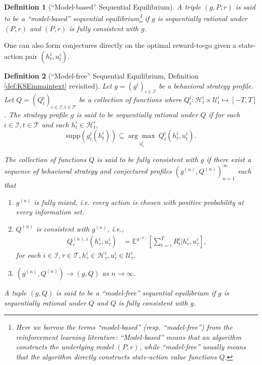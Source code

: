\documentclass[pdflatex,sn-basic]{sn-jnl}
\newcommand{\E}{\mathbb{E}}
\newcommand{\Qfunc}{Q}
\theoremstyle{thmstyleone}%
\theoremstyle{thmstyletwo}%
\theoremstyle{thmstylethree}%
\newtheorem{defn}{Definition}
\begin{document}
\begin{appendices}
\begin{defn}[``Model-based'' Sequential Equilibrium]
	A triple $(g, P, r)$ is said to be a \emph{``model-based'' sequential equilibrium}\footnote{Here we borrow the terms ``model-based'' (resp. ``model-free'') from the reinforcement learning literature: ``Model-based'' means that an algorithm constructs the underlying model $(P, r)$, while ``model-free'' usually means that the algorithm directly constructs state-action value functions $\Qfunc$.} if $g$ is sequentially rational under $(P, r)$ and $(P, r)$ is fully consistent with $g$.
\end{defn}

One can also form conjectures directly on the optimal reward-to-go given a state-action pair $(h_t^i, u_t^i)$. 
\begin{defn}[``Model-free'' Sequential Equilibrium, Definition \ref{def:KSEinmaintext} revisited]\label{def:KSE}
	Let $g=(g^i)_{i\in\mathcal{I}}$ be a behavioral strategy profile. Let $\Qfunc=(\Qfunc_t^i)_{i\in\mathcal{I},t\in\mathcal{T}}$ be a collection of functions where $\Qfunc_t^i\colon\mathcal{H}_t^i \times \mathcal{U}_t^i \mapsto [-T, T]$. The strategy profile $g$ is said to be sequentially rational under $\Qfunc$ if for each $i\in\mathcal{I}, t\in\mathcal{T}$ and each $h_t^i\in\mathcal{H}_t^i$, 
	\begin{equation}
		\mathrm{supp}(g_t^i(h_t^i))\subseteq \underset{u_t^i}{\arg\max}~ \Qfunc_t^i(h_t^i, u_t^i).
	\end{equation}
	
	The collection of functions $\Qfunc$ is said to be fully consistent with $g$ if there exist a sequence of behavioral strategy and conjectured profiles  $(g^{(n)}, \Qfunc^{(n)})_{n=1}^\infty$ such that
	\begin{enumerate}[(1)]
		\item $g^{(n)}$ is fully mixed, i.e. every action is chosen with positive probability at every information set.
		\item $\Qfunc^{(n)}$ is consistent with $g^{(n)}$, i.e.,
		\begin{align}
			\Qfunc_\tau^{(n), i}(h_\tau^i, u_\tau^i)&=\E^{g^{(n)}}\left[\sum_{t=\tau}^T R_t^i\Big|h_\tau^i, u_\tau^i\right],
		\end{align}
		for each $i\in\mathcal{I}, \tau\in\mathcal{T}, h_\tau^i\in \mathcal{H}_\tau^i, u_\tau^i\in \mathcal{U}_\tau^i$.
		\item $(g^{(n)}, \Qfunc^{(n)})\rightarrow (g, \Qfunc)$ as $n\rightarrow\infty$.
	\end{enumerate}
	A tuple $(g, \Qfunc)$ is said to be a ``model-free'' sequential equilibrium if $g$ is sequentially rational under $\Qfunc$ and $\Qfunc$ is fully consistent with $g$.
\end{defn}	


\end{appendices}
\end{document}
